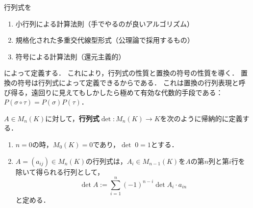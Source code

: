 \documentclass[uplatex, dvipdfmx]{jsreport}
\begin{document}
\begin{tcolorbox}[colframe=ForestGreen, colback=ForestGreen!10!white, breakable]
    行列式を
    \begin{enumerate}
        \item 小行列による計算法則（手でやるのが良いアルゴリズム）
        \item 規格化された多重交代線型形式（公理論で採用するもの）
        \item 符号による計算法則（還元主義的）
    \end{enumerate}
    によって定義する．
    これにより，行列式の性質と置換の符号の性質を導く．
    置換の符号は行列式によって定義できるからである．
    これは置換の行列表現と呼び得る，遠回りに見えてもしかしたら極めて有効な代数的手段である：$P(\sigma\circ\tau)=P(\sigma)P(\tau)$．
\end{tcolorbox}

\begin{definition}[determinant]
    $A\in M_n(K)$に対して，\textbf{行列式}$\det:M_n(K)\to K$を次のように帰納的に定義する．
    \begin{enumerate}
        \item $n=0$の時，$M_0(K)=0$であり，$\det\; 0=1$とする．
        \item $A=(a_{ij})\in M_n(K)$の行列式は，$A_i\in M_{n-1}(K)$を$A$の第$n$列と第$i$行を除いて得られる行列として，
        \[ \det A:=\sum^n_{i=1}(-1)^{n-i}\det A_i\cdot a_{in} \]
        と定める．
    \end{enumerate}
\end{definition}
\end{document}

